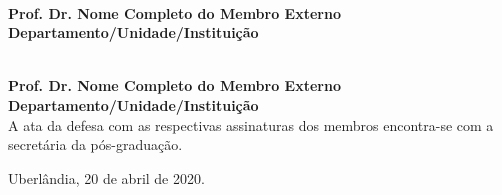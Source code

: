 \begin{center}
\begin{flushleft}
		\hrulefill\\
		\textbf{Prof. Dr. Nome Completo do Membro Externo \\
			Departamento/Unidade/Instituição \\}
		\vspace{0.5cm}
		
		\hrulefill\\
		\textbf{Prof. Dr. Nome Completo do Membro Externo \\
			Departamento/Unidade/Instituição \\}
		\vspace{0.5cm}
		A ata da defesa com as respectivas assinaturas dos membros encontra-se com a secretária da pós-graduação.
	\end{flushleft}
	
	\begin{flushright}
		\vspace{1.2cm}
		Uberlândia, 20 de abril de 2020.
	\end{flushright}
	
\end{center}